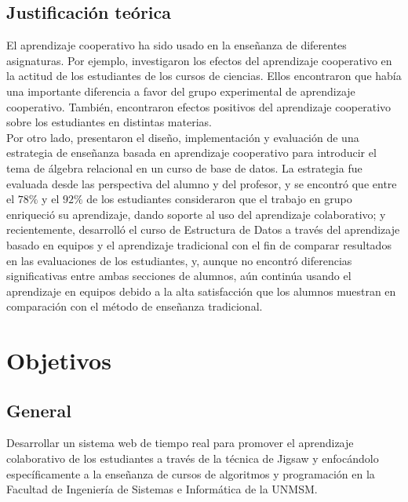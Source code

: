 \subsection{Justificación teórica}
El aprendizaje cooperativo ha sido usado en la enseñanza de diferentes asignaturas. Por ejemplo,  investigaron los efectos del aprendizaje cooperativo en la actitud de los estudiantes de los cursos de ciencias. Ellos encontraron que había una importante diferencia a favor del grupo experimental de aprendizaje cooperativo. También,  encontraron efectos positivos del aprendizaje cooperativo sobre los estudiantes en distintas materias.\\

Por otro lado,  presentaron el diseño, implementación y evaluación de una estrategia de enseñanza basada en aprendizaje cooperativo para introducir el tema de álgebra relacional en un curso de base de datos. La estrategia fue evaluada desde las perspectiva del alumno y del profesor, y se encontró que entre el $78\%$ y el $92\%$ de los estudiantes consideraron que el trabajo en grupo enriqueció su aprendizaje, dando soporte al uso del aprendizaje colaborativo; y recientemente,  desarrolló el curso de Estructura de Datos a través del aprendizaje basado en equipos y el aprendizaje tradicional con el fin de comparar resultados en las evaluaciones de los estudiantes, y, aunque no encontró diferencias significativas entre ambas secciones de alumnos, aún continúa usando el aprendizaje en equipos debido a la alta satisfacción que los alumnos muestran en comparación con el método de enseñanza tradicional.\\





\section{Objetivos}
\subsection{General}
Desarrollar un sistema web de tiempo real para promover el aprendizaje colaborativo de los estudiantes a través de la técnica de Jigsaw y enfocándolo específicamente a la enseñanza de cursos de algoritmos y programación en la Facultad de Ingeniería de Sistemas e Informática de la UNMSM.
